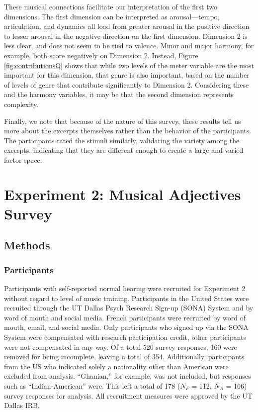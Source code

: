 \documentclass[
  english,
  man,floatsintext]{apa6}
\begin{document}
These musical connections facilitate our interpretation of the first two dimensions. The first dimension can be interpreted as arousal---tempo, articulation, and dynamics all load from greater arousal in the positive direction to lesser arousal in the negative direction on the first dimension. Dimension 2 is less clear, and does not seem to be tied to valence. Minor and major harmony, for example, both score negatively on Dimension 2. Instead, Figure \ref{fig:contributionsQ} shows that while two levels of the meter variable are the most important for this dimension, that genre is also important, based on the number of levels of genre that contribute significantly to Dimension 2. Considering these and the harmony variables, it may be that the second dimension represents complexity.

Finally, we note that because of the nature of this survey, these results tell us more about the excerpts themselves rather than the behavior of the participants. The participants rated the stimuli similarly, validating the variety among the excerpts, indicating that they are different enough to create a large and varied factor space.

\hypertarget{experiment-2-musical-adjectives-survey}{%
\section{Experiment 2: Musical Adjectives Survey}\label{experiment-2-musical-adjectives-survey}}

\hypertarget{methods-1}{%
\subsection{Methods}\label{methods-1}}

\hypertarget{participants-2}{%
\subsubsection{Participants}\label{participants-2}}

Participants with self-reported normal hearing were recruited for Experiment 2 without regard to level of music training. Participants in the United States were recruited through the UT Dallas Psych Research Sign-up (SONA) System and by word of mouth and social media. French participants were recruited by word of mouth, email, and social media. Only participants who signed up via the SONA System were compensated with research participation credit, other participants were not compensated in any way. Of a total 520 survey responses, 160 were removed for being incomplete, leaving a total of 354. Additionally, participants from the US who indicated solely a nationality other than American were excluded from analysis. ``Ghanian,'' for example, was not included, but responses such as ``Indian-American'' were. This left a total of 178 (\(\textit{N}_F\) = 112, \(\textit{N}_A\) = 166) survey responses for analysis. All recruitment measures were approved by the UT Dallas IRB.
\end{document}
